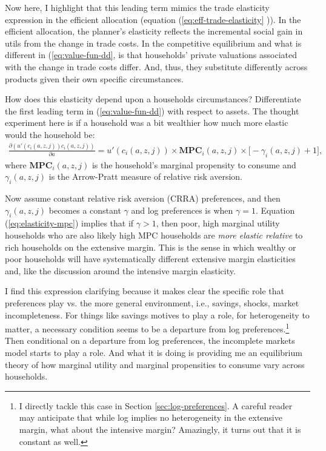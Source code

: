\documentclass[12pt,pdftex]{article}
\begin{document}
\begin{onehalfspacing}
Now here, I highlight that this leading term mimics the trade elasticity expression in the efficient allocation (equation (\ref{eq:eff-trade-elasticity} )). In the efficient allocation, the planner's elasticity reflects the incremental social gain in utils from the change in trade costs. In the competitive equilibrium and what is different in (\ref{eq:value-fun-dd}, is that households' private valuations associated with the change in trade costs differ. And, thus, they substitute differently across products given their own specific circumstances.

How does this elasticity depend upon a households circumstances? Differentiate the first leading term in (\ref{eq:value-fun-dd}) with respect to assets. The thought experiment here is if a household was a bit wealthier how much more elastic would the household be:
\begin{align}
\frac{\partial (u'(c_{i}(a,z,j))c_{i}(a,z,j))}{\partial a} = u'(c_{i}(a,z,j))\times \mathbf{MPC}_{i}(a,z,j) \times \bigg[-\gamma_{i}(a,z,j) + 1\bigg], \label{eq:elasticity-mpc}
\end{align}
where $\mathbf{MPC}_{i}(a,z,j)$ is the household's marginal propensity to consume and $\gamma_{i}(a,z,j)$ is the Arrow-Pratt measure of relative risk aversion.

Now assume constant relative risk aversion (CRRA) preferences, and then $\gamma_{i}(a,z,j)$ becomes a constant $\gamma$ and log preferences is when $\gamma = 1$. Equation (\ref{eq:elasticity-mpc}) implies that if $\gamma > 1$, then poor, high marginal utility households who are also likely high MPC households are \emph{more elastic relative} to rich households on the extensive margin. This is the sense in which wealthy or poor households will have systematically different extensive margin elasticities and, like the discussion around the intensive margin elasticity.

I find this expression clarifying because it makes clear the specific role that preferences play vs. the more general environment, i.e., savings, shocks, market incompleteness. For things like savings motives to play a role, for heterogeneity to matter, a necessary condition seems to be a departure from log preferences.\footnote{I directly tackle this case in Section \ref{sec:log-preferences}. A careful reader may anticipate that while log implies no heterogeneity in the extensive margin, what about the intensive margin? Amazingly, it turns out that it is constant as well.} Then conditional on a departure from log preferences, the incomplete markets model starts to play a role. And what it is doing is providing me an equilibrium theory of how marginal utility and marginal propensities to consume vary across households.


\end{onehalfspacing}
\end{document}
